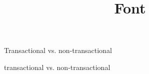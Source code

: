 \documentclass[]{beamer}
\title[]{Font}
\begin{document}
\maketitle
\begin{frame}{Transactional vs. non-transactional}
  \begin{center}
    transactional vs. non-transactional
  \end{center}
\end{frame}
\end{document}
